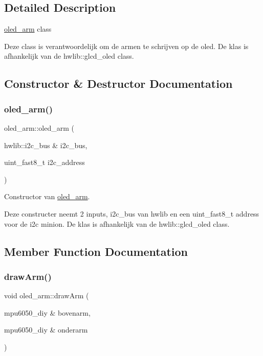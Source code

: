\subsection{Detailed Description}
\hyperlink{classoled__arm}{oled\+\_\+arm} class 

Deze class is verantwoordelijk om de armen te schrijven op de oled. De klas is afhankelijk van de hwlib\+::glcd\+\_\+oled class. 

\subsection{Constructor \& Destructor Documentation}
\mbox{\label{classoled__arm_a0d1436ad9431a1778767beef0510c908}} 
\subsubsection{\texorpdfstring{oled\+\_\+arm()}{oled\_arm()}}
{\footnotesize\ttfamily oled\+\_\+arm\+::oled\+\_\+arm (\begin{DoxyParamCaption}\item[{hwlib\+::i2c\+\_\+bus \&}]{i2c\+\_\+bus,  }\item[{uint\+\_\+fast8\+\_\+t}]{i2c\+\_\+address }\end{DoxyParamCaption})\hspace{0.3cm}{\ttfamily [inline]}}



Constructor van \hyperlink{classoled__arm}{oled\+\_\+arm}. 

Deze constructer neemt 2 inputs, i2c\+\_\+bus van hwlib en een uint\+\_\+fast8\+\_\+t address voor de i2c minion. De klas is afhankelijk van de hwlib\+::glcd\+\_\+oled class. 

\subsection{Member Function Documentation}
\mbox{\label{classoled__arm_a5d43e95edefb6f7fc363f4da8d1c3b1e}} 
\subsubsection{\texorpdfstring{draw\+Arm()}{drawArm()}}
{\footnotesize\ttfamily void oled\+\_\+arm\+::draw\+Arm (\begin{DoxyParamCaption}\item[{mpu6050\+\_\+diy \&}]{bovenarm,  }\item[{mpu6050\+\_\+diy \&}]{onderarm }\end{DoxyParamCaption})\hspace{0.3cm}{\ttfamily [inline]}}



